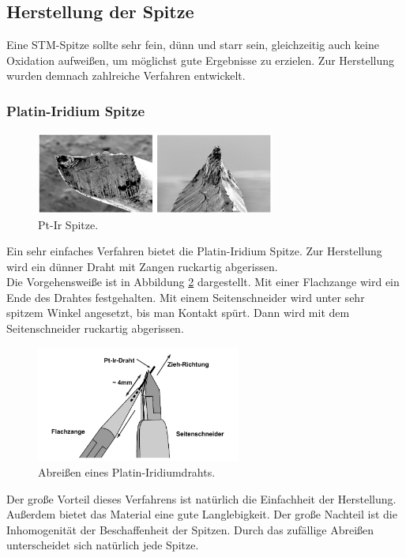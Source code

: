     \subsection{Herstellung der Spitze}

Eine STM-Spitze sollte sehr fein, dünn und starr sein, gleichzeitig auch keine 
Oxidation aufweißen, um möglichst gute Ergebnisse zu erzielen. Zur Herstellung 
wurden demnach zahlreiche Verfahren entwickelt. 

        \subsubsection{Platin-Iridium Spitze}

\begin{figure}[h]
    \centering
    \includegraphics[width=0.7\textwidth]{Abb/pt-ir.png}
    \caption{Pt-Ir Spitze. \cite{nanosurf}}
    \label{ptir}
\end{figure}
Ein sehr einfaches Verfahren bietet die Platin-Iridium Spitze. Zur Herstellung wird
ein dünner Draht mit Zangen ruckartig abgerissen.\\
Die Vorgehensweiße ist in Abbildung \ref{ptirverf} dargestellt. Mit einer Flachzange
wird ein Ende des Drahtes festgehalten. Mit einem Seitenschneider wird unter sehr 
spitzem Winkel angesetzt, bis man Kontakt spürt. Dann wird mit dem Seitenschneider
ruckartig abgerissen.
\begin{figure}[h]
    \centering
    \includegraphics[width=0.6\textwidth]{Abb/pt-it-verf.png}
    \caption{Abreißen eines Platin-Iridiumdrahts. \cite{nanosurf}}
    \label{ptirverf}
\end{figure}
Der große Vorteil dieses Verfahrens ist natürlich die Einfachheit der Herstellung.
Außerdem bietet das Material eine gute Langlebigkeit. Der große Nachteil ist die
Inhomogenität der Beschaffenheit der Spitzen. Durch das zufällige Abreißen 
unterscheidet sich natürlich jede Spitze.

